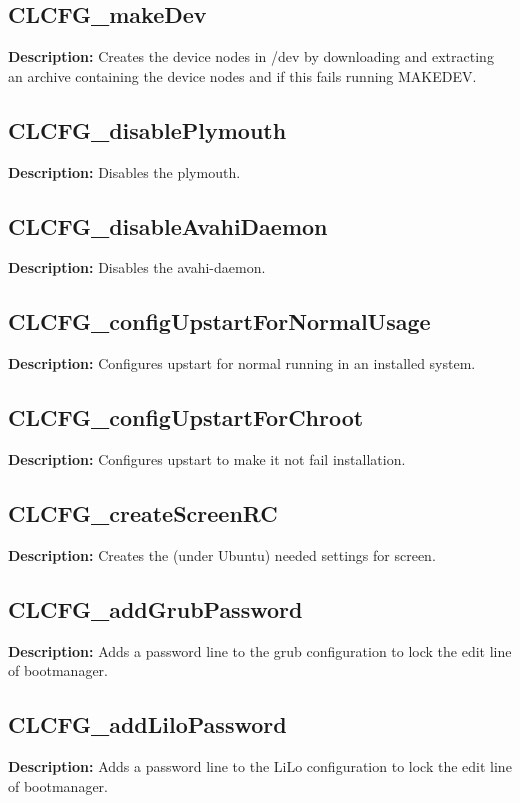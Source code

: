 \subsection{CLCFG\_makeDev}
\textbf{Description:} Creates the device nodes in /dev by downloading and extracting an archive containing the device nodes and if this fails running MAKEDEV.\\

\subsection{CLCFG\_disablePlymouth}
\textbf{Description:} Disables the plymouth.\\

\subsection{CLCFG\_disableAvahiDaemon}
\textbf{Description:} Disables the avahi-daemon.\\

\subsection{CLCFG\_configUpstartForNormalUsage}
\textbf{Description:} Configures upstart for normal running in an installed system.\\

\subsection{CLCFG\_configUpstartForChroot}
\textbf{Description:} Configures upstart to make it not fail installation.\\

\subsection{CLCFG\_createScreenRC}
\textbf{Description:} Creates the (under Ubuntu) needed settings for screen.\\

\subsection{CLCFG\_addGrubPassword}
\textbf{Description:} Adds a password line to the grub configuration to lock the edit line of bootmanager.\\

\subsection{CLCFG\_addLiloPassword}
\textbf{Description:} Adds a password line to the LiLo configuration to lock the edit line of bootmanager.\\

